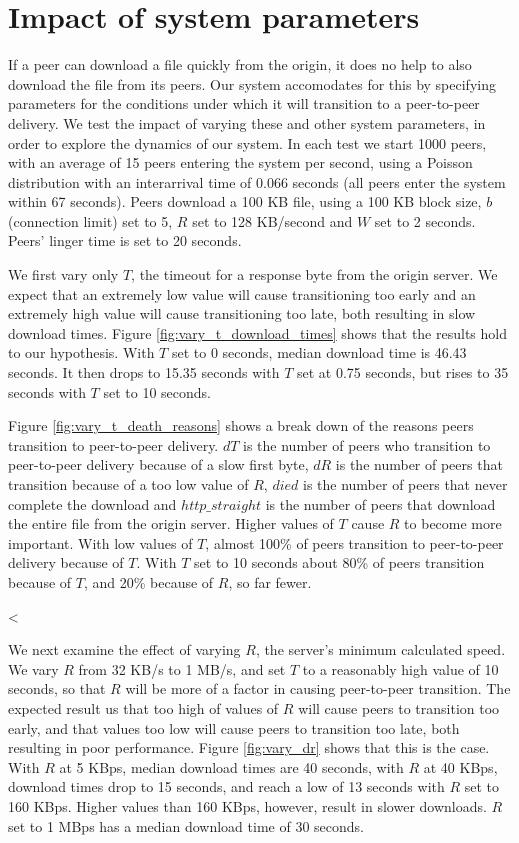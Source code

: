 \section{Impact of system parameters}

If a peer can download a file quickly from the origin, it does no help to also download the file from its
peers. Our system accomodates for this by specifying parameters for the conditions under which it will 
transition to a peer-to-peer delivery. We test the impact of varying these and other system parameters, in order 
to explore the dynamics of our system. In each test we start 1000 peers, with an average of 15 peers entering 
the system per second, using a Poisson distribution with an interarrival time of 0.066 seconds (all peers enter the system within 67 seconds). 
Peers download a 100 KB file, using a 100 KB block size, $b$ (connection limit) set to 5, $R$ set to 128 KB/second and $W$ set to 2 seconds.
Peers' linger time is set to 20 seconds.

We first vary only $T$, the timeout for a response byte from the origin server. We expect that an extremely low value 
will cause transitioning too early and an extremely high value 
will cause transitioning too late, both resulting in slow download times. Figure \ref{fig:vary_t_download_times} shows that 
the results hold to our hypothesis. With $T$ set to 0 seconds, median download time is 46.43 seconds. It then drops to 15.35 seconds with $T$ set at 0.75 seconds, 
but rises to 35 seconds with $T$ set to 10 seconds.

Figure \ref{fig:vary_t_death_reasons} shows a break down of the reasons peers transition to peer-to-peer delivery.  $dT$ is the number
of peers who transition to peer-to-peer delivery because of a slow first byte, $dR$ is the number of
peers that transition because of a too low value of $R$, $died$ is the number of peers that never complete the download and $http\_straight$ is the number of peers
that download the entire file from the origin server.
Higher values of $T$ cause $R$ to become more important.  With low values of $T$, almost 100\% of peers transition to peer-to-peer delivery because of $T$. 
With $T$ set to 10 seconds about 80\% of peers transition because of $T$, and 20\% because of $R$, so far fewer.

<%

We next examine the effect of varying $R$, the server's minimum calculated speed.  We vary $R$ from 32 KB/s to 1 MB/s, and set $T$ to a 
reasonably high value of 10 seconds, so that $R$ will be more of a factor in causing peer-to-peer transition. 
The expected result us that too high of values of $R$ will cause peers to transition 
too early, and that values too low will cause peers to transition too late, both resulting in poor performance. Figure \ref{fig:vary_dr} shows that this is the case.
With $R$ at 5 KBps, median download times are 40 seconds, with $R$ at 40 KBps, download times drop to 15 seconds, and reach
a low of 13 seconds with $R$ set to 160 KBps. Higher values than 160 KBps, however, result in slower downloads.  $R$ set to 1 MBps has a median download time of 30 seconds. 

